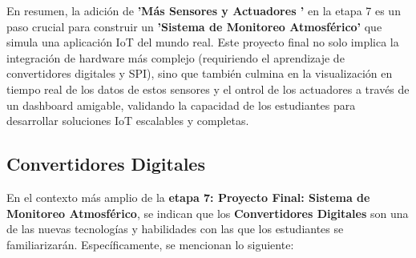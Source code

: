 \documentclass{report}
\begin{document}
En resumen, la adición de \textbf{ 'Más Sensores y Actuadores '} en la etapa 7 es un paso crucial para construir un \textbf{'Sistema de Monitoreo 
Atmosférico'} que simula una aplicación IoT del mundo real. Este proyecto final no solo implica la integración de hardware más complejo (requiriendo 
el aprendizaje de convertidores digitales y SPI), sino que también culmina en la visualización en tiempo real de los datos de estos sensores y el 
ontrol de los actuadores a través de un dashboard amigable, validando la capacidad de los estudiantes para desarrollar soluciones IoT escalables y completas.

\subsection{Convertidores Digitales}
En el contexto más amplio de la \textbf{etapa 7: Proyecto Final: Sistema de Monitoreo Atmosférico}, se  indican que los 
\textbf{Convertidores Digitales} son una de las nuevas tecnologías y habilidades con las que los estudiantes se familiarizarán. Específicamente, 
se  mencionan lo siguiente:
\end{document}
